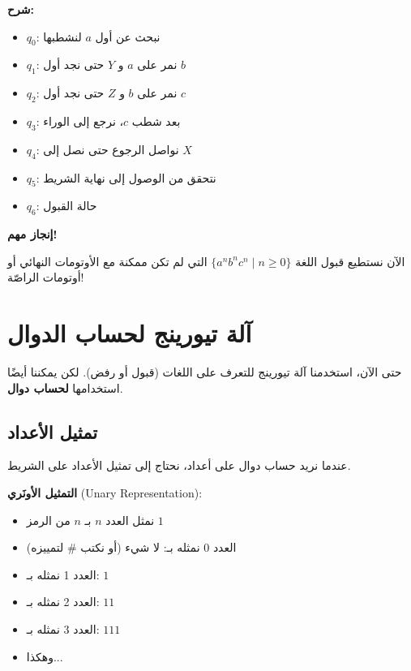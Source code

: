 \documentclass[14pt]{extarticle}
\begin{document}
\textbf{شرح:}
\begin{itemize}
    \item $q_0$: نبحث عن أول $a$ لنشطبها
    \item $q_1$: نمر على $a$ و $Y$ حتى نجد أول $b$
    \item $q_2$: نمر على $b$ و $Z$ حتى نجد أول $c$
    \item $q_3$: بعد شطب $c$، نرجع إلى الوراء
    \item $q_4$: نواصل الرجوع حتى نصل إلى $X$
    \item $q_5$: نتحقق من الوصول إلى نهاية الشريط
    \item $q_6$: حالة القبول
\end{itemize}

\begin{boxAttention}
\textbf{إنجاز مهم!}

الآن نستطيع قبول اللغة $\{a^n b^n c^n \mid n \geq 0\}$ التي لم تكن ممكنة مع الأوتومات النهائي أو أوتومات الراصّة!
\end{boxAttention}

\clearpage

\section{آلة تيورينج لحساب الدوال}

حتى الآن، استخدمنا آلة تيورينج للتعرف على اللغات (قبول أو رفض). لكن يمكننا أيضًا استخدامها \textbf{لحساب دوال}.

\subsection{تمثيل الأعداد}

عندما نريد حساب دوال على أعداد، نحتاج إلى تمثيل الأعداد على الشريط.

\textbf{التمثيل الأونَري} (\textenglish{Unary Representation}):
\begin{itemize}
    \item نمثل العدد $n$ بـ $n$ من الرمز $1$
    \item العدد 0 نمثله بـ: لا شيء (أو نكتب $\#$ لتمييزه)
    \item العدد 1 نمثله بـ: $1$
    \item العدد 2 نمثله بـ: $11$
    \item العدد 3 نمثله بـ: $111$
    \item وهكذا...
\end{itemize}
\end{document}
